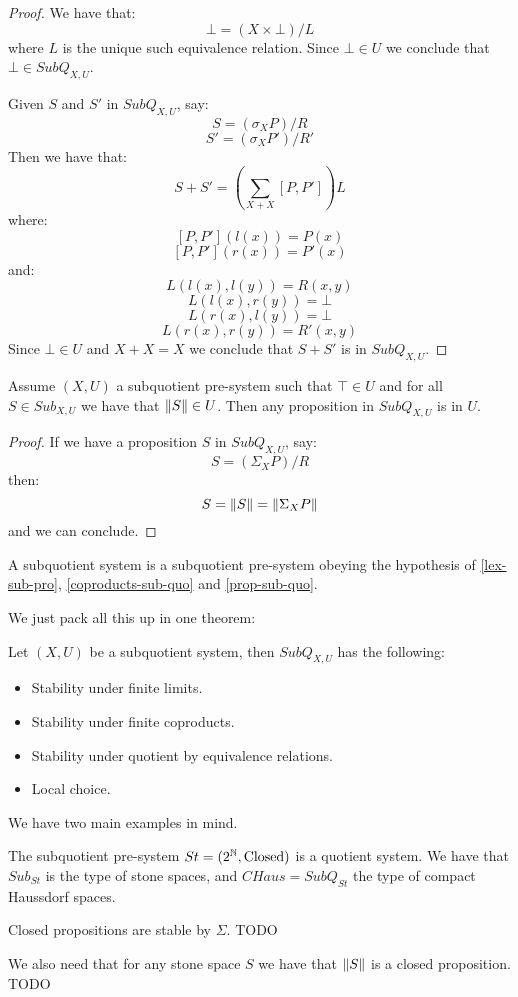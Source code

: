 \begin{proof}
We have that:
\[\bot = (X\times \bot) / L\]
where $L$ is the unique such equivalence relation. Since $\bot\in U$ we conclude that $\bot\in SubQ_{X,U}$.

Given $S$ and $S'$ in $SubQ_{X,U}$, say:
\[S = (\sigma_XP)/R\]
\[S' = (\sigma_XP')/R'\]
Then we have that:
\[S+S' = \left(\sum_{X+X}[P,P']\right) L\]
where:
\[[P,P'](l(x)) = P(x)\]
\[[P,P'](r(x)) = P'(x)\]
and:
\[L(l(x),l(y)) = R(x,y)\]
\[L(l(x),r(y)) = \bot\]
\[L(r(x),l(y)) = \bot\]
\[L(r(x),r(y)) = R'(x,y)\]
Since $\bot\in U$ and $X+X=X$ we conclude that $S+S'$ is in $SubQ_{X,U}$.
\end{proof}

\begin{proposition}\label{prop-sub-quo}
Assume $(X,U)$ a subquotient pre-system such that $\top\in U$ and for all $S\in Sub_{X,U}$ we have that $\lVert S \rVert\in U$. Then any proposition in $SubQ_{X,U}$ is in $U$. 
\end{proposition}

\begin{proof}
If we have a proposition $S$ in $SubQ_{X,U}$, say:
\[S = (\Sigma_XP)/R\]
then:
\[S = \lVert S \rVert = \lVert \Sigma_XP \rVert\]
and we can conclude.
\end{proof}

\begin{definition}
A subquotient system is a subquotient pre-system obeying the hypothesis of \cref{lex-sub-pro}, \cref{coproducts-sub-quo} and \cref{prop-sub-quo}.
\end{definition}

We just pack all this up in one theorem:

\begin{theorem}\label{stabitity-sub-quo}
Let $(X,U)$ be a subquotient system, then $SubQ_{X,U}$ has the following:
\begin{itemize}
\item Stability under finite limits.
\item Stability under finite coproducts.
\item Stability under quotient by equivalence relations.
\item Local choice.
\end{itemize}
\end{theorem}

We have two main examples in mind.

\begin{example}
The subquotient pre-system $St = (2^{\mathbb{N}},\mathrm{Closed})$ is a quotient system. We have that $Sub_{St}$ is the type of stone spaces, and $CHaus = SubQ_{St}$ the type of compact Haussdorf spaces.

Closed propositions are stable by $\Sigma$. TODO 

We also need that for any stone space $S$ we have that $\lVert S \rVert$ is a closed proposition. TODO
\end{example}

